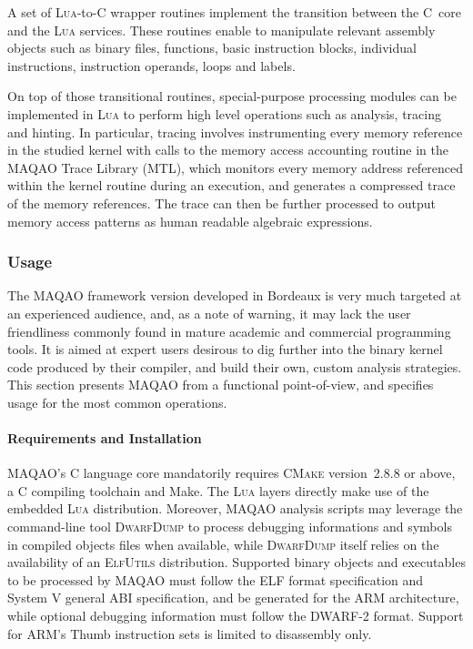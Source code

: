 \documentclass[11pt, a4paper, twoside]{montblanc2}
\def\cmake{\textsc{CMake}\xspace}
\def\lua{\textsc{Lua}\xspace}
\def\dd{\textsc{DwarfDump}\xspace}
\def\elfutils{\textsc{ElfUtils}\xspace}
\begin{document}
A set of \lua-to-C wrapper routines implement the transition between the C~core and the \lua 
services. These routines enable to manipulate relevant assembly objects such as binary files, 
functions, basic instruction blocks, individual instructions, instruction operands, loops and 
labels. 

On top of those transitional routines, special-purpose processing modules can be implemented in \lua 
to perform high level operations such as analysis, tracing and hinting. In particular, tracing 
involves instrumenting every memory reference in the studied kernel with calls to the memory access 
accounting routine in the MAQAO Trace Library (MTL), which monitors every memory address referenced 
within the kernel routine during an execution, and generates a compressed trace of the memory 
references. The trace can then be further processed to output memory access patterns as human 
readable algebraic expressions.

\subsubsection{Usage}

The MAQAO framework version developed in Bordeaux is very much targeted at an experienced audience, 
and, as a note of warning, it may lack the user friendliness commonly found in mature academic and 
commercial programming tools. It is aimed at expert users desirous to dig further into the binary 
kernel code produced by their compiler, and build their own, custom analysis strategies.
This section presents MAQAO from a functional point-of-view, and specifies usage for the most common
operations.

\paragraph{Requirements and Installation}

MAQAO's C language core mandatorily requires \cmake version~2.8.8 or above, a C compiling toolchain 
and Make. The \lua layers directly make use of the embedded \lua distribution. Moreover, MAQAO 
analysis scripts may leverage the command-line tool \dd to process debugging informations and 
symbols in compiled objects files when available, while \dd itself relies on the availability of an 
\elfutils distribution. Supported binary objects and executables to be processed by MAQAO must 
follow the ELF format specification and System V general ABI specification, and be generated for the 
ARM architecture, while optional debugging information must follow the DWARF-2 format. Support for 
ARM's Thumb instruction sets is limited to disassembly only.
\end{document}

